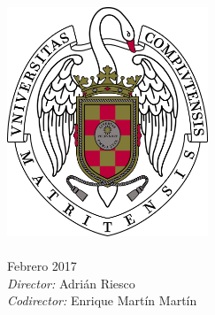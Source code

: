 \documentclass[
11pt, %
english, %
singlespacing, %
headsepline, %
]{MastersDoctoralThesis} %
\author{Mayra Alexandra Castrosqui Florián} %
\begin{document}
\frontmatter %

\pagestyle{plain} %


\begin{titlepage}
\begin{center}

\HRule \\[0.4cm] %
{\huge \bfseries \ttitle\par}\vspace{0.4cm} %
\HRule \\[1.5cm] %

\LARGE \authorname \\[0.5cm]
\textsc{\Large \degreename}\\ %
\textsc{\Large \facname}\\ %
\textsc{\Large \univname}\\[1.5cm] %

\includegraphics[width=6cm]{Figures/UCM} \\[1.5cm] %


\textsc{\LARGE \subjectname}\\ %
\Large Febrero 2017 \\[1.5cm] 

\large \emph{Director:} Adrián Riesco \\
\large \emph{Codirector:} Enrique Martín Martín \\
 
\vfill
\end{center}
\end{titlepage}
\end{document}
